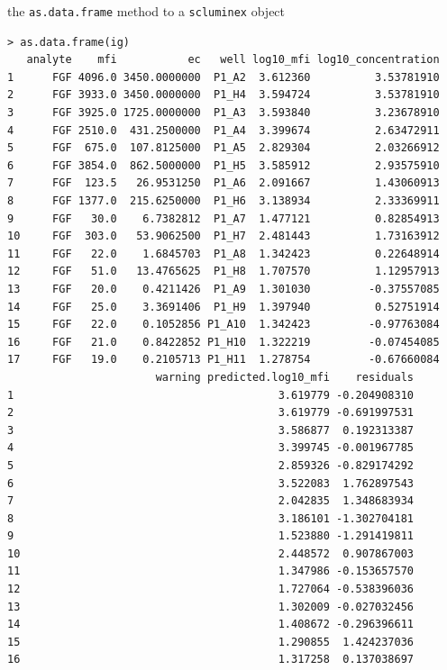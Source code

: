 \documentclass[11pt]{article}\usepackage[]{graphicx}\usepackage[]{color}
\makeatletter
\newenvironment{kframe}{%
 \def\at@end@of@kframe{}%
 \ifinner\ifhmode%
  \def\at@end@of@kframe{\end{minipage}}%
  \begin{minipage}{\columnwidth}%
 \fi\fi%
 \def\FrameCommand##1{\hskip\@totalleftmargin \hskip-\fboxsep
 \colorbox{shadecolor}{##1}\hskip-\fboxsep
     \hskip-\linewidth \hskip-\@totalleftmargin \hskip\columnwidth}%
 \MakeFramed {\advance\hsize-\width
   \@totalleftmargin\z@ \linewidth\hsize
   \@setminipage}}%
 {\par\unskip\endMakeFramed%
 \at@end@of@kframe}
\newenvironment{knitrout}{}{} %
\makeatother
\begin{document}
\noindent the {\tt as.data.frame} method to a {\tt scluminex} object
\begin{knitrout}\small
{}\color{fgcolor}\begin{kframe}
\begin{verbatim}
> as.data.frame(ig)
   analyte    mfi           ec   well log10_mfi log10_concentration
1      FGF 4096.0 3450.0000000  P1_A2  3.612360          3.53781910
2      FGF 3933.0 3450.0000000  P1_H4  3.594724          3.53781910
3      FGF 3925.0 1725.0000000  P1_A3  3.593840          3.23678910
4      FGF 2510.0  431.2500000  P1_A4  3.399674          2.63472911
5      FGF  675.0  107.8125000  P1_A5  2.829304          2.03266912
6      FGF 3854.0  862.5000000  P1_H5  3.585912          2.93575910
7      FGF  123.5   26.9531250  P1_A6  2.091667          1.43060913
8      FGF 1377.0  215.6250000  P1_H6  3.138934          2.33369911
9      FGF   30.0    6.7382812  P1_A7  1.477121          0.82854913
10     FGF  303.0   53.9062500  P1_H7  2.481443          1.73163912
11     FGF   22.0    1.6845703  P1_A8  1.342423          0.22648914
12     FGF   51.0   13.4765625  P1_H8  1.707570          1.12957913
13     FGF   20.0    0.4211426  P1_A9  1.301030         -0.37557085
14     FGF   25.0    3.3691406  P1_H9  1.397940          0.52751914
15     FGF   22.0    0.1052856 P1_A10  1.342423         -0.97763084
16     FGF   21.0    0.8422852 P1_H10  1.322219         -0.07454085
17     FGF   19.0    0.2105713 P1_H11  1.278754         -0.67660084
                       warning predicted.log10_mfi    residuals
1                                         3.619779 -0.204908310
2                                         3.619779 -0.691997531
3                                         3.586877  0.192313387
4                                         3.399745 -0.001967785
5                                         2.859326 -0.829174292
6                                         3.522083  1.762897543
7                                         2.042835  1.348683934
8                                         3.186101 -1.302704181
9                                         1.523880 -1.291419811
10                                        2.448572  0.907867003
11                                        1.347986 -0.153657570
12                                        1.727064 -0.538396036
13                                        1.302009 -0.027032456
14                                        1.408672 -0.296396611
15                                        1.290855  1.424237036
16                                        1.317258  0.137038697

\end{verbatim}
\end{kframe}
\end{knitrout}
\end{document}
